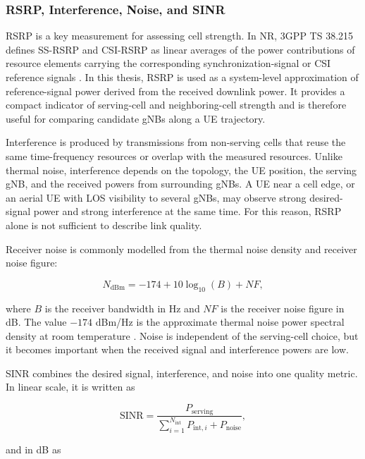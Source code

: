 \subsubsection{RSRP, Interference, Noise, and SINR}

RSRP is a key measurement for assessing cell strength. In NR, 3GPP TS 38.215 defines SS-RSRP and CSI-RSRP as linear averages of the power contributions of resource elements carrying the corresponding synchronization-signal or CSI reference signals \cite{3gpp_38215}. In this thesis, RSRP is used as a system-level approximation of reference-signal power derived from the received downlink power. It provides a compact indicator of serving-cell and neighboring-cell strength and is therefore useful for comparing candidate gNBs along a UE trajectory.

Interference is produced by transmissions from non-serving cells that reuse the same time-frequency resources or overlap with the measured resources. Unlike thermal noise, interference depends on the topology, the UE position, the serving gNB, and the received powers from surrounding gNBs. A UE near a cell edge, or an aerial UE with LOS visibility to several gNBs, may observe strong desired-signal power and strong interference at the same time. For this reason, RSRP alone is not sufficient to describe link quality.

Receiver noise is commonly modelled from the thermal noise density and receiver noise figure:

\begin{equation}
    N_{\mathrm{dBm}} = -174 + 10\log_{10}(B) + NF,
\end{equation}

where \(B\) is the receiver bandwidth in Hz and \(NF\) is the receiver noise figure in dB. The value \(-174\) dBm/Hz is the approximate thermal noise power spectral density at room temperature \cite{rappaport2002}. Noise is independent of the serving-cell choice, but it becomes important when the received signal and interference powers are low.

SINR combines the desired signal, interference, and noise into one quality metric. In linear scale, it is written as

\begin{equation}
    \mathrm{SINR} = \frac{P_{\mathrm{serving}}}{\sum_{i=1}^{N_{\mathrm{int}}} P_{\mathrm{int},i} + P_{\mathrm{noise}}},
\end{equation}

and in dB as

